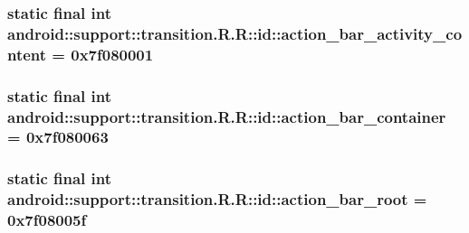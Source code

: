 \hypertarget{classandroid_1_1support_1_1transition_1_1_r_1_1id_a16c91cd164fdfb89785da279ff8374d}{
\subsubsection[{action\_\-bar\_\-activity\_\-content}]{\setlength{\rightskip}{0pt plus 5cm}static final int android::support::transition.R.R::id::action\_\-bar\_\-activity\_\-content = 0x7f080001}}
\label{classandroid_1_1support_1_1transition_1_1_r_1_1id_a16c91cd164fdfb89785da279ff8374d}


\hypertarget{classandroid_1_1support_1_1transition_1_1_r_1_1id_31acd9219df2c744873feabd8ce07d53}{
\subsubsection[{action\_\-bar\_\-container}]{\setlength{\rightskip}{0pt plus 5cm}static final int android::support::transition.R.R::id::action\_\-bar\_\-container = 0x7f080063}}
\label{classandroid_1_1support_1_1transition_1_1_r_1_1id_31acd9219df2c744873feabd8ce07d53}


\hypertarget{classandroid_1_1support_1_1transition_1_1_r_1_1id_03af219d939f86b10cd772be42fc0b16}{
\subsubsection[{action\_\-bar\_\-root}]{\setlength{\rightskip}{0pt plus 5cm}static final int android::support::transition.R.R::id::action\_\-bar\_\-root = 0x7f08005f}}
\label{classandroid_1_1support_1_1transition_1_1_r_1_1id_03af219d939f86b10cd772be42fc0b16}


